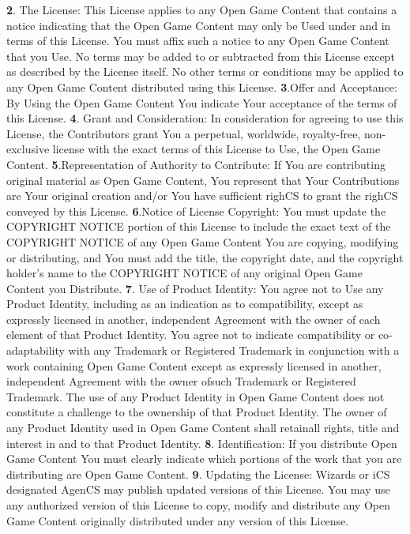 \documentclass[a4paper,11pt,twoside,openany]{book}
\begin{document}
{{\textbf{2}. The License: This License applies to any Open Game Content that contains a notice indicating that the Open Game Content may only be Used under and in terms of this License. You must affix such a notice to any Open Game Content that you Use. No terms may be added to or subtracted from this License except as described by the License itself. No other terms or conditions may be applied to any Open Game Content distributed using this License.
\textbf{3}.Offer and Acceptance: By Using the Open Game Content You indicate Your acceptance of the terms of this License.
\textbf{4}. Grant and Consideration: In consideration for agreeing to use this License, the Contributors grant You a perpetual, worldwide, royalty-free, non-exclusive license with the exact terms of this License to Use, the Open Game Content.
\textbf{5}.Representation of Authority to Contribute: If You are contributing original material as Open Game Content, You represent that Your Contributions are Your original creation and/or You have sufficient righCS to grant the righCS conveyed by this License.
\textbf{6}.Notice of License Copyright: You must update the COPYRIGHT NOTICE portion of this License to include the exact text of the COPYRIGHT NOTICE of any Open Game Content You are copying, modifying or distributing, and You must add the title, the copyright date, and the copyright holder's name to the COPYRIGHT NOTICE of any original Open Game Content you Distribute.
\textbf{7}. Use of Product Identity: You agree not to Use any Product Identity, including as an indication as to compatibility, except as expressly licensed in another, independent Agreement with the owner of each element of that Product Identity. You agree not to indicate compatibility or co-adaptability with any Trademark or Registered Trademark in conjunction with a work containing Open Game Content except as expressly licensed in another, independent Agreement with the owner ofsuch Trademark or Registered Trademark. The use of any Product Identity in Open Game Content does not constitute a challenge to the ownership of that Product Identity. The owner of any Product Identity used in Open Game Content shall retainall rights, title and interest in and to that Product 
Identity.
\textbf{8}. Identification: If you distribute Open Game Content You must clearly indicate which portions of the work that you are distributing are Open Game Content.
\textbf{9}. Updating the License: Wizards or iCS designated AgenCS may publish updated versions of this License. You may use any authorized version of this License to copy, modify and distribute any Open Game Content originally distributed under any version of this License.
}}
\end{document}
